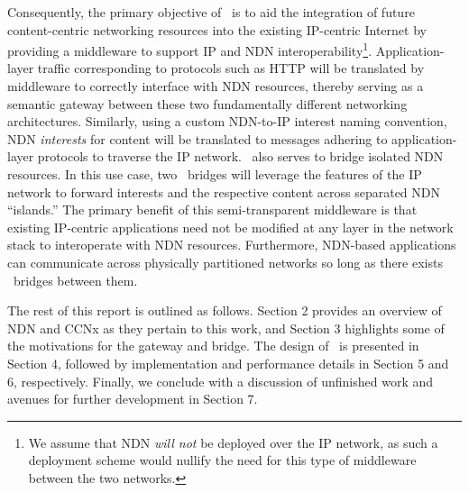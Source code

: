 Consequently, the primary objective of \sink\ is to aid the integration of future content-centric networking resources into the existing IP-centric Internet by providing a middleware to support IP and NDN interoperability\footnote{We assume that NDN \emph{will not} be deployed over the IP network, as such a deployment scheme would nullify the need for this type of middleware between the two networks.}. Application-layer traffic corresponding to protocols such as HTTP will be translated by middleware to correctly interface with NDN resources, thereby serving as a semantic gateway between these two fundamentally different networking architectures. Similarly, using a custom NDN-to-IP interest naming convention, NDN \emph{interests} for content will be translated to messages adhering to application-layer protocols to traverse the IP network. \sink\ also serves to bridge isolated NDN resources. In this use case, two \sink\ bridges will leverage the features of the IP network to forward interests and the respective content across separated NDN ``islands.'' The primary benefit of this semi-transparent middleware is that existing IP-centric applications need not be modified at any layer in the network stack to interoperate with NDN resources. Furthermore, NDN-based applications can communicate across physically partitioned networks so long as there exists \sink\ bridges between them. 

The rest of this report is outlined as follows. Section 2 provides an overview of NDN and CCNx as they pertain to this work, and Section 3 highlights some of the motivations for the gateway and bridge. The design of \sink\ is presented in Section 4, followed by implementation and performance details in Section 5 and 6, respectively. Finally, we conclude with a discussion of unfinished work and avenues for further development in Section 7. 





